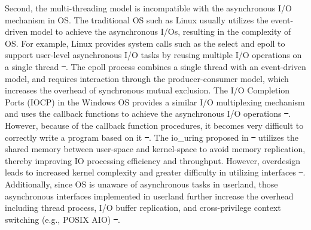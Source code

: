 \documentclass[sigconf,review,anonymous]{acmart}
\providecommand{\DIFdel}[1]{{\protect\color{red}\sout{#1}}}                      %
\providecommand{\DIFdelbegin}{} %
\providecommand{\DIFdelend}{} %
\begin{document}
Second, the multi-threading model is incompatible with the asynchronous I/O mechanism in OS. The traditional OS such as Linux usually utilizes the event-driven model to achieve the asynchronous I/Os, resulting in the complexity of OS. For example, Linux provides system calls such as the select and epoll to support user-level asynchronous I/O tasks by reusing multiple I/O operations on a single thread \DIFdelbegin \DIFdel{~}\DIFdelend \cite{Gammo2004ComparingAE}. The epoll process combines a single thread with an event-driven model, and requires interaction through the producer-consumer model, which increases the overhead of synchronous mutual exclusion. The I/O Completion Ports (IOCP) in the Windows OS provides a similar I/O multiplexing mechanism and uses the callback functions to achieve the asynchronous I/O operations \DIFdelbegin \DIFdel{~}\DIFdelend \cite{alvinashcraft_io_2022}. However, because of the callback function procedures, it becomes very difficult to correctly write a program based on it \DIFdelbegin \DIFdel{~}\DIFdelend \cite{callbackhell}. The io\_uring proposed in \DIFdelbegin \DIFdel{~}\DIFdelend \cite{io_uring} utilizes the shared memory between user-space and kernel-space to avoid memory replication, thereby improving IO processing efficiency and throughput. However, overdesign leads to increased kernel complexity and greater difficulty in utilizing interfaces \DIFdelbegin \DIFdel{~}\DIFdelend \cite{li2021pm}. Additionally, since OS is unaware of asynchronous tasks in userland, those asynchronous interfaces implemented in userland further increase the overhead including thread process, I/O buffer replication, and cross-privilege context switching (e.g., POSIX AIO) \DIFdelbegin \DIFdel{~}\DIFdelend \cite{jones2006boost}.

\DIFdelbegin %
\end{document}
